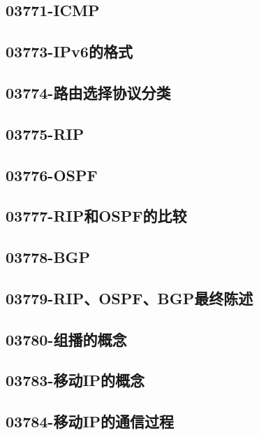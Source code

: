 \subsection{03771-ICMP}

\subsection{03773-IPv6的格式}

\subsection{03774-路由选择协议分类}

\subsection{03775-RIP}

\subsection{03776-OSPF}

\subsection{03777-RIP和OSPF的比较}

\subsection{03778-BGP}

\subsection{03779-RIP、OSPF、BGP最终陈述}

\subsection{03780-组播的概念}

\subsection{03783-移动IP的概念}

\subsection{03784-移动IP的通信过程}

